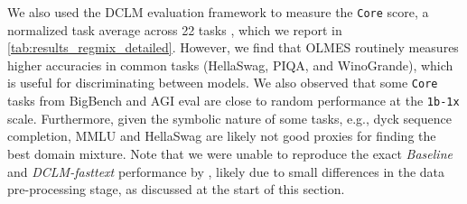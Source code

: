 We also used the DCLM evaluation framework to measure the {\tt Core} score, a normalized task average across 22 tasks \citep{li2024datacomplm}, which we report in \autoref{tab:results_regmix_detailed}.
However, we find that OLMES routinely measures higher accuracies in common tasks (HellaSwag, PIQA, and WinoGrande), which is useful for discriminating between models.
We also observed that some {\tt Core} tasks from BigBench and AGI eval are close to random performance at the {\tt 1b-1x} scale. Furthermore, given the symbolic nature of some tasks, e.g., dyck sequence completion, MMLU and HellaSwag are likely not good proxies for finding the best domain mixture. Note that we were unable to reproduce the exact {\it Baseline} and {\it DCLM-fasttext} performance by \citet{li2024datacomplm}, likely due to small differences in the data pre-processing stage, as discussed at the start of this section.



